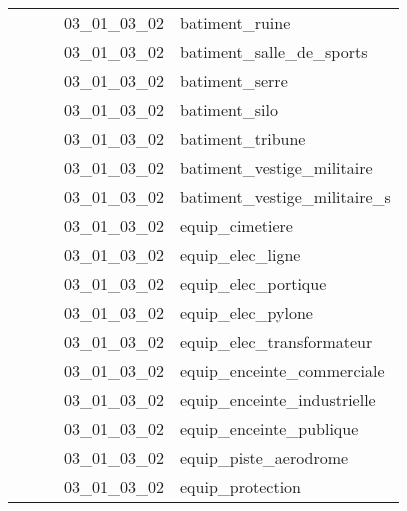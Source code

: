 \documentclass[12pt,titlepage]{book}
\begin{document}
\begin{supertabular}{|p{7.5cm}|p{7.5cm}|p{7.5cm}|c|p{10cm}|}
                   &                    &                    & 03\_01\_03\_02 & batiment\_ruine\\
                   &                    &                    & 03\_01\_03\_02 & batiment\_salle\_de\_sports\\
                   &                    &                    & 03\_01\_03\_02 & batiment\_serre\\
                   &                    &                    & 03\_01\_03\_02 & batiment\_silo\\
                   &                    &                    & 03\_01\_03\_02 & batiment\_tribune\\
                   &                    &                    & 03\_01\_03\_02 & batiment\_vestige\_militaire\\
                   &                    &                    & 03\_01\_03\_02 & batiment\_vestige\_militaire\_s\\
                   &                    &                    & 03\_01\_03\_02 & equip\_cimetiere\\
                   &                    &                    & 03\_01\_03\_02 & equip\_elec\_ligne\\
                   &                    &                    & 03\_01\_03\_02 & equip\_elec\_portique\\
                   &                    &                    & 03\_01\_03\_02 & equip\_elec\_pylone\\
                   &                    &                    & 03\_01\_03\_02 & equip\_elec\_transformateur\\
                   &                    &                    & 03\_01\_03\_02 & equip\_enceinte\_commerciale\\
                   &                    &                    & 03\_01\_03\_02 & equip\_enceinte\_industrielle\\
                   &                    &                    & 03\_01\_03\_02 & equip\_enceinte\_publique\\
                   &                    &                    & 03\_01\_03\_02 & equip\_piste\_aerodrome\\
                   &                    &                    & 03\_01\_03\_02 & equip\_protection\\

\end{supertabular}
\end{document}
